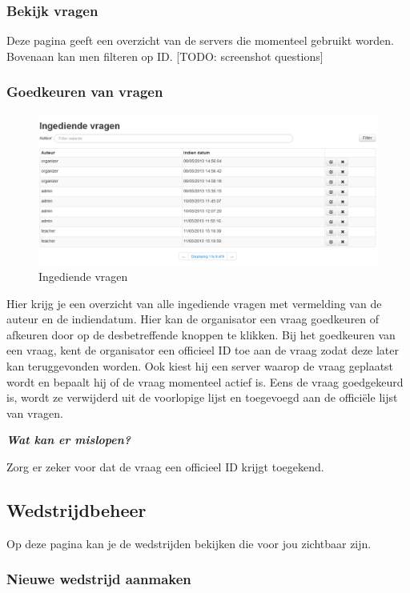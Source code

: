\documentclass[]{article}
\begin{document}
\subsubsection{Bekijk vragen}
Deze pagina geeft een overzicht van de servers die momenteel gebruikt worden. Bovenaan kan men filteren op ID. [TODO: screenshot questions]

\subsubsection{Goedkeuren van vragen}

\begin{figure}[!ht]
	\centering
	\includegraphics[width=1\textwidth]{img/questionsubmits}
	\caption{Ingediende vragen}
	\label{questionsubmits}
\end{figure}

Hier krijg je een overzicht van alle ingediende vragen met vermelding van de auteur en de indiendatum. Hier kan de organisator een vraag goedkeuren of afkeuren door op de desbetreffende knoppen te klikken. Bij het goedkeuren van een vraag, kent de organisator een officieel ID toe aan de vraag zodat deze later kan teruggevonden worden. Ook kiest hij een server waarop de vraag geplaatst wordt en bepaalt hij of de vraag momenteel actief is. Eens de vraag goedgekeurd is, wordt ze verwijderd uit de voorlopige lijst en toegevoegd aan de officiële lijst van vragen.

\textbf{\textit{Wat kan er mislopen?}}

Zorg er zeker voor dat de vraag een officieel ID krijgt toegekend.

\subsection{Wedstrijdbeheer}
Op deze pagina kan je de wedstrijden bekijken die voor jou zichtbaar zijn. 

\subsubsection{Nieuwe wedstrijd aanmaken}
\end{document}
